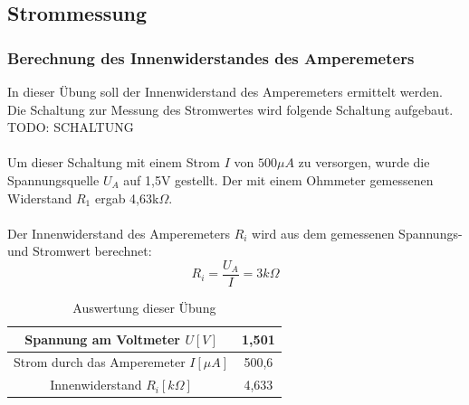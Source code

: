 \subsection{Strommessung}
\subsubsection{Berechnung des Innenwiderstandes des Amperemeters}
In dieser Übung soll der Innenwiderstand des Amperemeters ermittelt werden. Die Schaltung zur Messung des Stromwertes wird folgende Schaltung aufgebaut.
~\\
TODO: SCHALTUNG		\\
~\\
Um dieser Schaltung mit einem Strom $I$ von $500\mu A$ zu versorgen, wurde die Spannungsquelle $U_A$ auf 1,5V gestellt. Der mit einem Ohmmeter gemessenen Widerstand $R_1$ ergab 4,63k$\Omega$. \\
~\\
Der Innenwiderstand des Amperemeters $R_i$ wird aus dem gemessenen Spannungs- und Stromwert berechnet:
\begin{equation}
	R_i = \dfrac{U_A}{I} = 3k\Omega
\end{equation}
\begin{table}[h]
	\centering
	\begin{tabular}{|c|c|}
	\hline 
	Spannung am Voltmeter $U [V]$				& 1,501	\\ 
	\hline 
	Strom durch das Amperemeter $I [\mu A]$ 		& 500,6	\\ 
	\hline 
	Innenwiderstand $R_i [k\Omega]$			& 4,633	\\ 
	\hline 
	\end{tabular}
	\caption{Auswertung dieser Übung}
\end{table}

